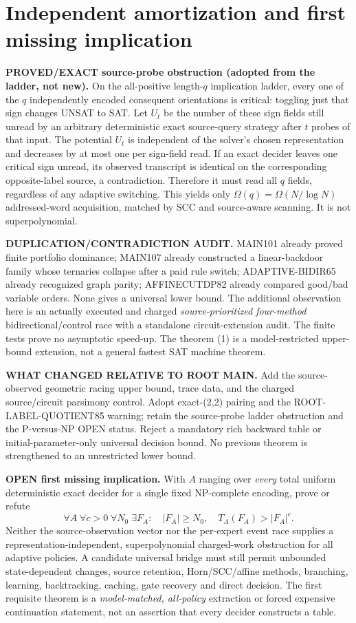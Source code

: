 \documentclass[11pt]{article}
\begin{document}
\section{Independent amortization and first missing implication}
\textbf{PROVED/EXACT source-probe obstruction (adopted from the ladder, not new).}
On the all-positive length-$q$ implication ladder, every one of the $q$ independently encoded consequent orientations is critical: toggling just that sign changes UNSAT to SAT. Let $U_t$ be the number of these sign fields still unread by an arbitrary deterministic exact source-query strategy after $t$ probes of that input. The potential $U_t$ is independent of the solver's chosen representation and decreases by at most one per sign-field read. If an exact decider leaves one critical sign unread, its observed transcript is identical on the corresponding opposite-label source, a contradiction. Therefore it must read all $q$ fields, regardless of any adaptive switching. This yields only $\Omega(q)=\Omega(N/\log N)$ addressed-word acquisition, matched by SCC and source-aware scanning. It is not superpolynomial.

\textbf{DUPLICATION/CONTRADICTION AUDIT.} MAIN101 already proved finite portfolio dominance; MAIN107 already constructed a linear-backdoor family whose ternaries collapse after a paid rule switch; ADAPTIVE-BIDIR65 already recognized graph parity; AFFINECUTDP82 already compared good/bad variable orders. None gives a universal lower bound. The additional observation here is an actually executed and charged \emph{source-prioritized four-method} bidirectional/control race with a standalone circuit-extension audit. The finite tests prove no asymptotic speed-up. The theorem (1) is a model-restricted upper-bound extension, not a general fastest SAT machine theorem.

\textbf{WHAT CHANGED RELATIVE TO ROOT MAIN.} Add the source-observed geometric racing upper bound, trace data, and the charged source/circuit parsimony control. Adopt exact-(2,2) pairing and the ROOT-LABEL-QUOTIENT85 warning; retain the source-probe ladder obstruction and the P-versus-NP OPEN status. Reject a mandatory rich backward table or initial-parameter-only universal decision bound. No previous theorem is strengthened to an unrestricted lower bound.

\textbf{OPEN first missing implication.} With $A$ ranging over \emph{every} total uniform deterministic exact decider for a single fixed NP-complete encoding, prove or refute
\[
\forall A\;\forall c>0\;\forall N_0\;\exists F_A:\quad
|F_A|\ge N_0,\quad T_A(F_A)>|F_A|^c .
\]
Neither the source-observation vector nor the per-expert event race supplies a representation-independent, superpolynomial charged-work obstruction for all adaptive policies. A candidate universal bridge must still permit unbounded state-dependent changes, source retention, Horn/SCC/affine methods, branching, learning, backtracking, caching, gate recovery and direct decision. The first requisite theorem is a \emph{model-matched, all-policy} extraction or forced expensive continuation statement, not an assertion that every decider constructs a table.
\end{document}
